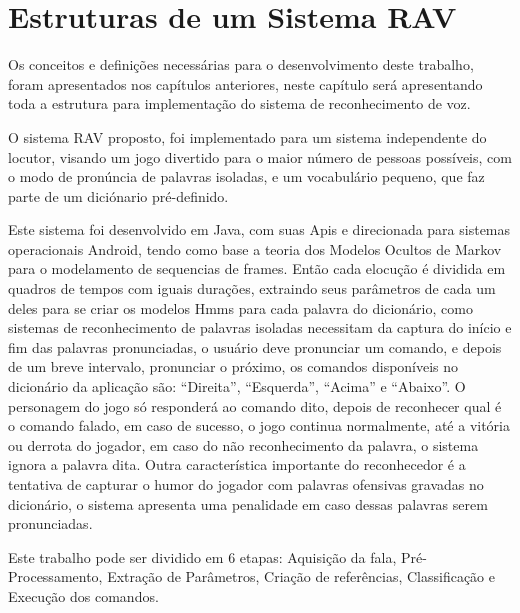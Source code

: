 \chapter{Estruturas de um Sistema RAV}
Os conceitos e definições necessárias para o desenvolvimento deste trabalho, foram apresentados nos capítulos anteriores, neste capítulo será apresentando toda a estrutura para implementação do sistema de reconhecimento de voz.

O sistema RAV proposto, foi implementado para um sistema independente do locutor, visando um jogo divertido para o maior número de pessoas possíveis, com o modo de pronúncia de palavras isoladas, e um vocabulário pequeno, que faz parte de um diciónario pré-definido. 

Este sistema foi desenvolvido em Java, com suas Apis e direcionada para sistemas operacionais Android, tendo como base a teoria dos Modelos Ocultos de Markov para o modelamento de sequencias de frames. Então cada elocução é dividida em quadros de tempos com iguais durações, extraindo seus parâmetros de cada um deles para se criar os modelos Hmms para cada palavra do dicionário, como sistemas de reconhecimento de palavras isoladas necessitam da captura do início e fim das palavras pronunciadas, o usuário deve pronunciar um comando, e depois de um breve intervalo, pronunciar o próximo, os comandos disponíveis no dicionário da aplicação são: “Direita”, “Esquerda”, “Acima” e “Abaixo”. O personagem do jogo só responderá ao comando dito, depois de reconhecer qual é o comando falado, em caso de sucesso, o jogo continua normalmente, até a vitória ou derrota do jogador, em caso do não reconhecimento da palavra, o sistema ignora a palavra dita. Outra característica importante do reconhecedor é a tentativa de capturar o humor do jogador com palavras ofensivas gravadas no dicionário, o sistema apresenta uma penalidade em caso dessas palavras serem pronunciadas.

Este trabalho pode ser dividido em 6 etapas: Aquisição da fala, Pré-Processamento, Extração de Parâmetros, Criação de referências, Classificação e Execução dos comandos.

